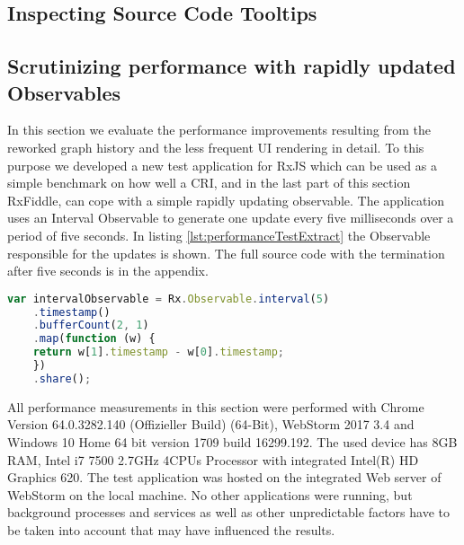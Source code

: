 	\subsection{Inspecting Source Code Tooltips}

	\subsection{Scrutinizing performance with rapidly updated Observables}
	\label{sec:PerformanceEvaluation}
	In this section we evaluate the performance improvements resulting from the reworked graph history and the less frequent UI rendering in detail. To this purpose we developed a new test application for RxJS which can be used as a simple benchmark on how well a CRI, and in the last part of this section RxFiddle, can cope with a simple rapidly updating observable. The application uses an Interval Observable to generate one update every five milliseconds over a period of five seconds. In listing \ref{lst:performanceTestExtract} the Observable responsible for the updates is shown. The full source code with the termination after five seconds is in the appendix. %
	
	\begin{lstlisting}[language=JavaScript, caption={Example of RxJS code.},label={lst:performanceTestExtract}]
	var intervalObservable = Rx.Observable.interval(5)
	.timestamp()
	.bufferCount(2, 1)
	.map(function (w) {
	return w[1].timestamp - w[0].timestamp;
	})
	.share();	
	\end{lstlisting}
	
	All performance measurements in this section were performed with Chrome Version 64.0.3282.140 (Offizieller Build) (64-Bit), WebStorm 2017 3.4 and Windows 10 Home 64 bit version 1709 build 16299.192. The used device has 8GB RAM, Intel i7 7500 2.7GHz 4CPUs Processor with integrated Intel(R) HD Graphics 620. The test application was hosted on the integrated Web server of WebStorm on the local machine. No other applications were running, but background processes and services as well as other unpredictable factors have to be taken into account that may have influenced the results.
	
